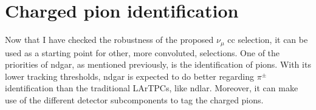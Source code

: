\section{Charged pion identification}
\label{sec:gar_charged_pions}

Now that I have checked the robustness of the proposed $\nu_{\mu}$ \gls{cc} selection, it can be used as a starting point for other, more convoluted, selections. One of the priorities of \gls{ndgar}, as mentioned previously, is the identification of pions. With its lower tracking thresholds, \gls{ndgar} is expected to do better regarding $\pi^{\pm}$ identification than the traditional LArTPCs, like \gls{ndlar}. Moreover, it can make use of the different detector subcomponents to tag the charged pions.

